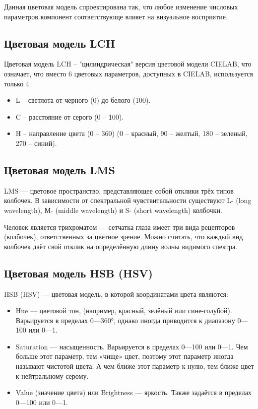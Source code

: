 \documentclass[a4paper,14pt, unknownkeysallowed]{extreport}
\begin{document}
    Данная цветовая модель спроектирована так, что любое изменение числовых параметров компонент соответствующе влияет на визуальное восприятие.

    \subsection{Цветовая модель LCH}

    Цветовая модель LCH – "цилиндрическая" версия цветовой модели CIELAB, что означает, что вместо 6 цветовых параметров, доступных в CIELAB, используется только 4.

    \begin{itemize}
        \item L – светлота от черного (0) до белого (100).
        \item C – расстояние от серого (0 – 100).
        \item H – направление цвета (0 – 360) (0 – красный, 90 – желтый, 180 – зеленый, 270 – синий).
    \end{itemize}

    \subsection{Цветовая модель LMS}

    LMS — цветовое пространство, представляющее собой отклики трёх типов колбочек. В зависимости от спектральной чувствительности существуют L- (long wavelength), М- (middle wavelength) и S- (short wavelength) колбочки.

    Человек является трихроматом — сетчатка глаза имеет три вида рецепторов (колбочек), ответственных за цветное зрение. Можно считать, что каждый вид колбочек даёт свой отклик на определённую длину волны видимого спектра.

    \subsection{Цветовая модель HSB (HSV)}

    HSB (HSV) --- цветовая модель, в которой координатами цвета являются:

    \begin{itemize}
        \item Hue --- цветовой тон, (например, красный, зелёный или сине-голубой). Варьируется в пределах 0—360°, однако иногда приводится к диапазону 0—100 или 0—1.
        \item Saturation --- насыщенность. Варьируется в пределах 0—100 или 0—1. Чем больше этот параметр, тем «чище» цвет, поэтому этот параметр иногда называют чистотой цвета. А чем ближе этот параметр к нулю, тем ближе цвет к нейтральному серому.
        \item Value (значение цвета) или Brightness — яркость. Также задаётся в пределах 0—100 или 0—1.
    \end{itemize}
\end{document}
